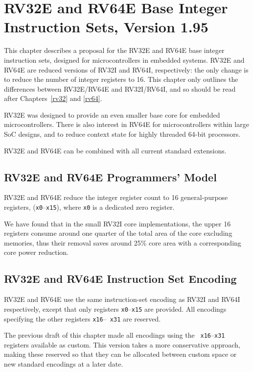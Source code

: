 \chapter{RV32E and RV64E Base Integer Instruction Sets, Version 1.95}
\label{rv32e}

This chapter describes a proposal for the RV32E and RV64E base integer
instruction sets, designed for microcontrollers in embedded systems.
RV32E and RV64E are reduced versions of RV32I and RV64I, respectively:
the only change is to reduce the number of integer registers to 16.
This chapter only outlines the differences between RV32E/RV64E and
RV32I/RV64I, and so should be read after Chapters~\ref{rv32} and
\ref{rv64}.

\begin{commentary}
RV32E was designed to provide an even smaller base core for embedded
microcontrollers.  There is also interest in RV64E for
microcontrollers within large SoC designs, and to reduce context state
for highly threaded 64-bit processors.

RV32E and RV64E can be combined with all current standard extensions.
\end{commentary}

\section{RV32E and RV64E Programmers' Model}

RV32E and RV64E reduce the integer register count to 16
general-purpose registers, ({\tt x0}--{\tt x15}), where {\tt x0} is a
dedicated zero register.

\begin{commentary}
We have found that in the small RV32I core implementations, the upper
16 registers consume around one quarter of the total area of the core
excluding memories, thus their removal saves around 25\% core area
with a corresponding core power reduction.
\end{commentary}

\section{RV32E and RV64E Instruction Set Encoding}

RV32E and RV64E use the same instruction-set encoding as RV32I and
RV64I respectively, except that only registers {\tt x0}--{\tt x15} are
provided.  All encodings specifying the other registers {\tt x16}--{\tt
  x31} are reserved.

\begin{commentary}
The previous draft of this chapter made all encodings using the {\tt
  x16}--{\tt x31} registers available as custom.  This version takes a
more conservative approach, making these reserved so that they can be
allocated between custom space or new standard encodings at a later
date.
\end{commentary}
